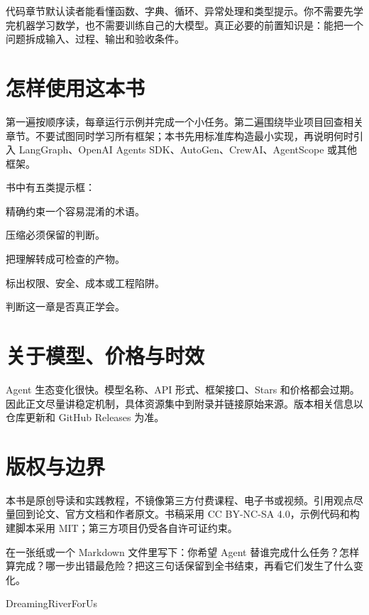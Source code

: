 代码章节默认读者能看懂函数、字典、循环、异常处理和类型提示。你不需要先学完机器学习数学，也不需要训练自己的大模型。真正必要的前置知识是：能把一个问题拆成输入、过程、输出和验收条件。

\section*{怎样使用这本书}

第一遍按顺序读，每章运行示例并完成一个小任务。第二遍围绕毕业项目回查相关章节。不要试图同时学习所有框架；本书先用标准库构造最小实现，再说明何时引入 LangGraph、OpenAI Agents SDK、AutoGen、CrewAI、AgentScope 或其他框架。

书中有五类提示框：

\begin{description}[style=nextline,leftmargin=2em]
  \item[定义] 精确约束一个容易混淆的术语。
  \item[本节要点] 压缩必须保留的判断。
  \item[动手任务] 把理解转成可检查的产物。
  \item[风险提示] 标出权限、安全、成本或工程陷阱。
  \item[完成检查] 判断这一章是否真正学会。
\end{description}

\section*{关于模型、价格与时效}

Agent 生态变化很快。模型名称、API 形式、框架接口、Stars 和价格都会过期。因此正文尽量讲稳定机制，具体资源集中到附录并链接原始来源。版本相关信息以仓库更新和 GitHub Releases 为准。

\section*{版权与边界}

本书是原创导读和实践教程，不镜像第三方付费课程、电子书或视频。引用观点尽量回到论文、官方文档和作者原文。书稿采用 CC BY-NC-SA 4.0，示例代码和构建脚本采用 MIT；第三方项目仍受各自许可证约束。

\begin{practice}[开始前的承诺]
在一张纸或一个 Markdown 文件里写下：你希望 Agent 替谁完成什么任务？怎样算完成？哪一步出错最危险？把这三句话保留到全书结束，再看它们发生了什么变化。
\end{practice}

\begin{flushright}
DreamingRiverForUs\\
\BookDate
\end{flushright}
